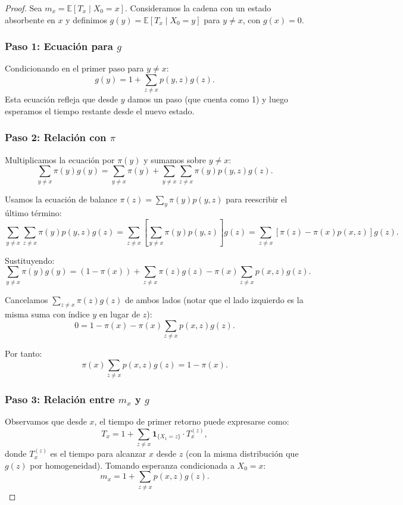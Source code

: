 \documentclass[11pt,a4paper]{article}
\theoremstyle{plain}
\theoremstyle{definition}
\theoremstyle{remark}
\newcommand{\1}{\mathds{1}}
\begin{document}
\begin{proof}
Sea \(m_x = \mathbb{E}[T_x \mid X_0 = x]\). Consideramos la cadena con un estado absorbente en \(x\) y definimos \(g(y) = \mathbb{E}[T_x \mid X_0 = y]\) para \(y \neq x\), con \(g(x) = 0\).

\subsubsection*{Paso 1: Ecuación para \(g\)}
Condicionando en el primer paso para \(y \neq x\):
\[
g(y) = 1 + \sum_{z \neq x} p(y,z) g(z).
\]
Esta ecuación refleja que desde \(y\) damos un paso (que cuenta como 1) y luego esperamos el tiempo restante desde el nuevo estado.

\subsubsection*{Paso 2: Relación con \(\pi\)}
Multiplicamos la ecuación por \(\pi(y)\) y sumamos sobre \(y \neq x\):
\[
\sum_{y \neq x} \pi(y) g(y) = \sum_{y \neq x} \pi(y) + \sum_{y \neq x} \sum_{z \neq x} \pi(y) p(y,z) g(z).
\]

Usamos la ecuación de balance \(\pi(z) = \sum_{y} \pi(y) p(y,z)\) para reescribir el último término:
\[
\sum_{y \neq x} \sum_{z \neq x} \pi(y) p(y,z) g(z) = \sum_{z \neq x} \left[ \sum_{y \neq x} \pi(y) p(y,z) \right] g(z) = \sum_{z \neq x} \left[ \pi(z) - \pi(x) p(x,z) \right] g(z).
\]

Sustituyendo:
\[
\sum_{y \neq x} \pi(y) g(y) = (1 - \pi(x)) + \sum_{z \neq x} \pi(z) g(z) - \pi(x) \sum_{z \neq x} p(x,z) g(z).
\]

Cancelamos \(\sum_{z \neq x} \pi(z) g(z)\) de ambos lados (notar que el lado izquierdo es la misma suma con índice \(y\) en lugar de \(z\)):
\[
0 = 1 - \pi(x) - \pi(x) \sum_{z \neq x} p(x,z) g(z).
\]

Por tanto:
\[
\pi(x) \sum_{z \neq x} p(x,z) g(z) = 1 - \pi(x).
\]

\subsubsection*{Paso 3: Relación entre \(m_x\) y \(g\)}
Observamos que desde \(x\), el tiempo de primer retorno puede expresarse como:
\[
T_x = 1 + \sum_{z \neq x} \mathbf{1}_{\{X_1 = z\}} \cdot T_x^{(z)},
\]
donde \(T_x^{(z)}\) es el tiempo para alcanzar \(x\) desde \(z\) (con la misma distribución que \(g(z)\) por homogeneidad). Tomando esperanza condicionada a \(X_0 = x\):
\[
m_x = 1 + \sum_{z \neq x} p(x,z) g(z).
\]


\end{proof}
\end{document}
